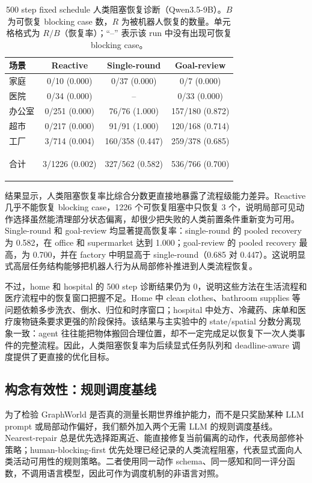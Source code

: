 \documentclass[journal]{IEEEtran}
\newcommand{\bestcell}[1]{\colorbox{green!12}{\strut #1}}
\begin{document}
\begin{table}[t]
\centering
\caption{500 step fixed schedule 人类阻塞恢复诊断（Qwen3.5-9B）。$B$ 为可恢复 blocking case 数，$R$ 为被机器人恢复的数量。单元格格式为 $R/B$（恢复率）；``--'' 表示该 run 中没有出现可恢复 blocking case。}
\label{tab:blocking-recovery}
\footnotesize
\setlength{\tabcolsep}{4pt}
\renewcommand{\arraystretch}{1.12}
\begin{tabular}{lccc}
\toprule
场景 & Reactive & Single-round & Goal-review \\
\midrule
家庭 & 0/10 (0.000) & 0/37 (0.000) & 0/7 (0.000) \\
医院 & 0/34 (0.000) & -- & 0/33 (0.000) \\
办公室 & 0/251 (0.000) & 76/76 (1.000) & 157/180 (0.872) \\
超市 & 0/217 (0.000) & 91/91 (1.000) & 120/168 (0.714) \\
工厂 & 3/714 (0.004) & 160/358 (0.447) & 259/378 (0.685) \\
\midrule
合计 & 3/1226 (0.002) & 327/562 (0.582) & \bestcell{536/766 (0.700)} \\
\bottomrule
\end{tabular}
\end{table}

结果显示，人类阻塞恢复率比综合分数更直接地暴露了流程级能力差异。Reactive 几乎不能恢复 blocking case，1226 个可恢复阻塞中只恢复 3 个，说明局部可见动作选择虽然能清理部分状态偏离，却很少把失败的人类前置条件重新变为可用。Single-round 和 goal-review 均显著提高恢复率：single-round 的 pooled recovery 为 0.582，在 office 和 supermarket 达到 1.000；goal-review 的 pooled recovery 最高，为 0.700，并在 factory 中明显高于 single-round（0.685 对 0.447）。这说明显式高层任务结构能够把机器人行为从局部修补推进到人类流程恢复。

不过，home 和 hospital 的 500 step 诊断结果仍为 0，说明这些方法在生活流程和医疗流程中的恢复窗口把握不足。Home 中 clean clothes、bathroom supplies 等问题依赖多步洗衣、倒水、归位和时序窗口；hospital 中处方、冷藏药、床单和医疗废物链条要求更强的阶段保持。该结果与主实验中的 state/spatial 分数分离现象一致：agent 往往能把物体搬回合理位置，却不一定完成足以恢复下一次人类事件的完整流程。因此，人类阻塞恢复率为后续显式任务队列和 deadline-aware 调度提供了更直接的优化目标。

\subsection{构念有效性：规则调度基线}
为了检验 GraphWorld 是否真的测量长期世界维护能力，而不是只奖励某种 LLM prompt 或局部动作偏好，我们额外加入两个无需 LLM 的规则调度基线。Nearest-repair 总是优先选择距离近、能直接修复当前偏离的动作，代表局部修补策略；human-blocking-first 优先处理已经记录的人类流程阻塞，代表显式面向人类活动可用性的规则策略。二者使用同一动作 schema、同一感知和同一评分函数，不调用语言模型，因此可作为调度机制的非语言对照。
\end{document}
